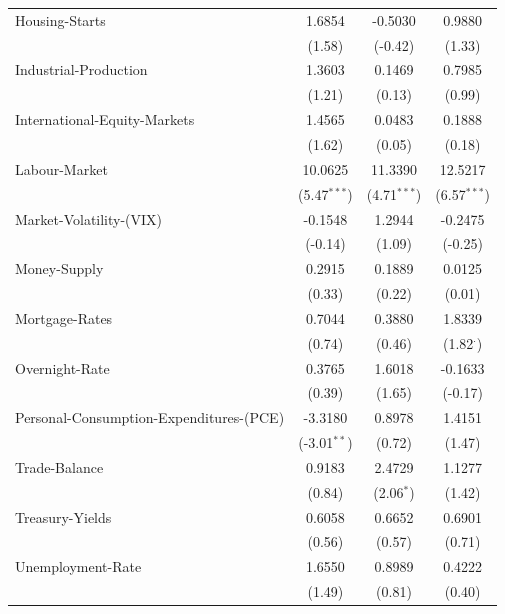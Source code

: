 \begin{tabular}{lccc}
Housing-Starts & 1.6854 & -0.5030 & 0.9880 \\
 & (1.58) & (-0.42) & (1.33) \\
Industrial-Production & 1.3603 & 0.1469 & 0.7985 \\
 & (1.21) & (0.13) & (0.99) \\
International-Equity-Markets & 1.4565 & 0.0483 & 0.1888 \\
 & (1.62) & (0.05) & (0.18) \\
Labour-Market & 10.0625 & 11.3390 & 12.5217 \\
 & (5.47$^{***}$) & (4.71$^{***}$) & (6.57$^{***}$) \\
Market-Volatility-(VIX) & -0.1548 & 1.2944 & -0.2475 \\
 & (-0.14) & (1.09) & (-0.25) \\
Money-Supply & 0.2915 & 0.1889 & 0.0125 \\
 & (0.33) & (0.22) & (0.01) \\
Mortgage-Rates & 0.7044 & 0.3880 & 1.8339 \\
 & (0.74) & (0.46) & (1.82$^{\cdot}$) \\
Overnight-Rate & 0.3765 & 1.6018 & -0.1633 \\
 & (0.39) & (1.65) & (-0.17) \\
Personal-Consumption-Expenditures-(PCE) & -3.3180 & 0.8978 & 1.4151 \\
 & (-3.01$^{**}$) & (0.72) & (1.47) \\
Trade-Balance & 0.9183 & 2.4729 & 1.1277 \\
 & (0.84) & (2.06$^{*}$) & (1.42) \\
Treasury-Yields & 0.6058 & 0.6652 & 0.6901 \\
 & (0.56) & (0.57) & (0.71) \\
Unemployment-Rate & 1.6550 & 0.8989 & 0.4222 \\
 & (1.49) & (0.81) & (0.40) \\
\hline
\end{tabular}